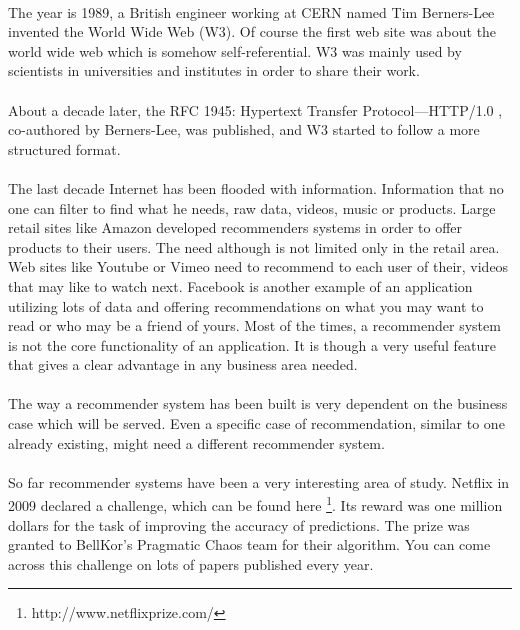 \paragraph{} The year is 1989, a British engineer working at CERN named Tim Berners-Lee invented the World Wide Web (W3). Of course the first web site was about the world wide web which is somehow self-referential. W3 was mainly used by scientists in universities and institutes in order to share their work. 

\paragraph{}About a decade later, the RFC 1945: Hypertext Transfer Protocol—HTTP/1.0 \cite{berners1997rfc}, co-authored by Berners-Lee, was published, and W3 started to follow a more structured format.

\paragraph{} The last decade Internet has been flooded with information. Information that no one can filter to find what he needs, raw data, videos, music or products. Large retail sites like Amazon developed recommenders systems in order to offer products to their users. The need although is not limited only in the retail area. Web sites like Youtube or Vimeo need to recommend to each user of their, videos that may like to watch next. Facebook is another example of an application utilizing lots of data and offering recommendations on what you may want to read or who may be a friend of yours. Most of the times, a recommender system is not the core functionality of an application. It is though a very useful feature that gives a clear advantage in any business area needed.

\paragraph{}The way a recommender system has been built is very dependent on the business case which will be served. Even a specific case of recommendation, similar to one already existing, might need a different recommender system.

\paragraph{} So far recommender systems have been a very interesting area of study. Netflix in 2009 declared a challenge, which can be found here \footnote{http://www.netflixprize.com/}. Its  reward was one million dollars for the task of improving the accuracy of predictions. The prize was granted to BellKor’s Pragmatic Chaos team for their algorithm. You can come across this challenge on lots of papers published every year.

